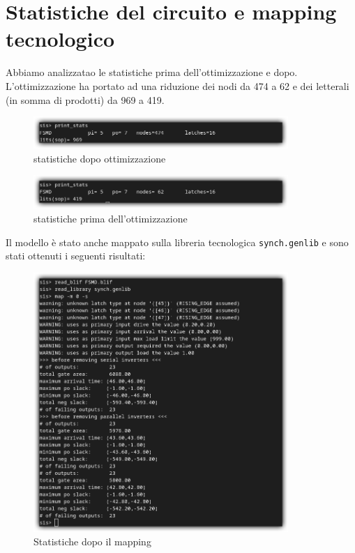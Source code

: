 \documentclass[a4paper]{report}
\begin{document}
\clearpage %


\section{Statistiche del circuito e mapping tecnologico}

Abbiamo analizzatao le statistiche prima dell'ottimizzazione e dopo.
L'ottimizzazione ha portato ad una riduzione dei nodi da 474 a 62 e dei letterali (in somma di prodotti) da 969 a 419.

  \begin{figure}[ht]
    \centering
      \includegraphics[width=0.86\textwidth]{not_opt.png}
      \caption{statistiche dopo ottimizzazione}
      \label{img:opt.png}
  \end{figure}

  \begin{figure}[h]
    \centering
      \includegraphics[width=0.86\textwidth]{opt.png}
      \caption{statistiche prima dell'ottimizzazione}
      \label{img:not_opt.png}
  \end{figure}


  Il modello è stato anche mappato sulla libreria tecnologica \texttt{synch.genlib} e sono stati ottenuti i seguenti risultati:
  \begin{figure}[hb]
    \centering
      \includegraphics[width=0.86\textwidth]{mapping.png}
      \caption{Statistiche dopo il mapping}
      \label{img:mapping.png}
  \end{figure}
\end{document}
